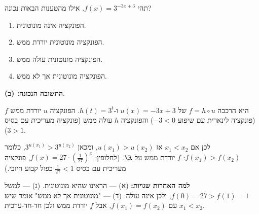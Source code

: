 
\begin{question}
תהי $f(x)=3^{-3x+3}$. אילו מהטענות הבאות נכונה?
\begin{enumerate}
  \item הפונקציה אינה מונוטונית.
  \item הפונקציה מונוטונית יורדת ממש.
  \item הפונקציה מונוטונית עולה ממש.
  \item הפונקציה מונוטונית אך לא ממש.
\end{enumerate}
\end{question}

\begin{solution}
\textbf{התשובה הנכונה: (ב)}.

$f$ היא הרכבה $f=h\circ u$ של $u(x)=-3x+3$ ו-$h(t)=3^t$. הפונקציה $u$ יורדת ממש (פונקציה לינארית עם שיפוע $-3<0$) והפונקציה $h$ עולה ממש (פונקציה מעריכית עם בסיס $3>1$).

לכן אם $x_1<x_2$ אז $u(x_1)>u(x_2)$, ומכאן $3^{u(x_1)}>3^{u(x_2)}$, כלומר $f(x_1)>f(x_2)$: $f$ יורדת ממש על $\R$.
(לחלופין: $f(x)=27\cdot\left(\frac{1}{27}\right)^{x}$, פונקציה מעריכית עם בסיס $\frac1{27}<1$ כפול קבוע חיובי.)

\textbf{למה האחרות שגויות:} (א) — הראינו שהיא מונוטונית. (ג) — למשל $f(0)=27>f(1)=1$, ולכן אינה עולה. (ד) — "מונוטונית אך לא ממש" אומר שיש $x_1<x_2$ עם $f(x_1)=f(x_2)$, אבל $f$ יורדת ממש ולכן חד-חד-ערכית.
\end{solution}
